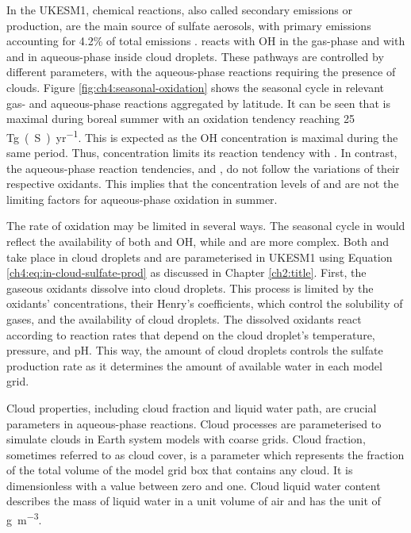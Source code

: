 In the UKESM1, chemical reactions, also called secondary emissions or production, are the main source of sulfate aerosols, with primary emissions accounting for 4.2\% of total emissions \citep[1.86 of \qty{43.95}{Tg(S)~yr^{-1}};][]{mulcahyDescriptionEvaluationAerosol2020}.  reacts with OH in the gas-phase and with  and  in aqueous-phase inside cloud droplets. These pathways are controlled by different parameters, with the aqueous-phase reactions requiring the presence of clouds. Figure \ref{fig:ch4:seasonal-oxidation} shows the seasonal cycle in relevant gas- and aqueous-phase reactions aggregated by latitude. It can be seen that  is maximal during boreal summer with an oxidation tendency reaching 25 \unit{Tg(S)~yr^{-1}}. This is expected as the OH concentration is maximal during the same period. Thus,  concentration limits its reaction tendency with . In contrast, the aqueous-phase reaction tendencies,  and , do not follow the variations of their respective oxidants. This implies that the concentration levels of  and  are not the limiting factors for aqueous-phase oxidation in summer.

The rate of oxidation may be limited in several ways. The seasonal cycle in  would reflect the availability of both  and OH, while  and  are more complex. Both  and  take place in cloud droplets and are parameterised in UKESM1 using Equation \ref{ch4:eq:in-cloud-sulfate-prod} as discussed in Chapter \ref{ch2:title}. First, the gaseous oxidants dissolve into cloud droplets. This process is limited by the oxidants' concentrations, their Henry's coefficients, which control the solubility of gases, and the availability of cloud droplets. The dissolved oxidants react according to reaction rates that depend on the cloud droplet's temperature, pressure, and pH. This way, the amount of cloud droplets controls the sulfate production rate as it determines the amount of available water in each model grid.

Cloud properties, including cloud fraction and liquid water path, are crucial parameters in aqueous-phase reactions. Cloud processes are parameterised to simulate clouds in Earth system models with coarse grids. Cloud fraction, sometimes referred to as cloud cover, is a parameter which represents the fraction of the total volume of the model grid box that contains any cloud. It is dimensionless with a value between zero and one. Cloud liquid water content describes the mass of liquid water in a unit volume of air and has the unit of \unit{\gram\per\cubic\metre}.

